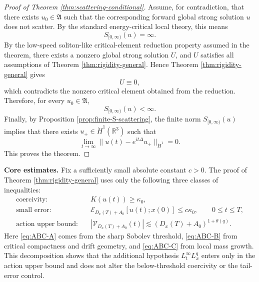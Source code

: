 \documentclass[smallextended,envcountsect,nospthms]{svjour3}
\numberwithin{equation}{section}
\theoremstyle{spbreak}
\theoremstyle{spdefbreak}
\theoremstyle{spdefbreak}
\newcommand{\R}{\mathbb R}
\begin{document}
\begin{proof}[Proof of Theorem \ref{thm:scattering-conditional}]
Assume, for contradiction, that there exists $u_0\in\mathfrak A$ such that the corresponding forward global strong solution $u$ does not scatter. By the standard energy-critical local theory, this means
\begin{equation*}
  S_{[0,\infty)}(u)=\infty.
\end{equation*}
By the low-speed soliton-like critical-element reduction property assumed in the theorem, there exists a nonzero global strong solution $U$, and $U$ satisfies all assumptions of Theorem \ref{thm:rigidity-general}. Hence Theorem \ref{thm:rigidity-general} gives
\begin{equation*}
  U\equiv0,
\end{equation*}
which contradicts the nonzero critical element obtained from the reduction. Therefore, for every $u_0\in\mathfrak A$,
\begin{equation*}
  S_{[0,\infty)}(u)<\infty.
\end{equation*}
Finally, by Proposition \ref{prop:finite-S-scattering}, the finite norm $S_{[0,\infty)}(u)$ implies that there exists $u_+\in\dot H^1(\R^3)$ such that
\begin{equation*}
  \lim_{t\to\infty}\|u(t)-e^{it\Delta}u_+\|_{\dot H^1}=0.
\end{equation*}
This proves the theorem.
\end{proof}

\medskip
\noindent\textbf{Core estimates.} Fix a sufficiently small absolute constant $c>0$. The proof of Theorem \ref{thm:rigidity-general} uses only the following three classes of inequalities:
\begin{align}
  \text{coercivity:}\quad &K(u(t))\ge\kappa_0,
  \label{eq:ABC-A}\\
  \text{small error:}\quad &\mathcal E_{D_x(T)+A_0}[u(t);x(0)]\le c\kappa_0,
  \qquad 0\le t\le T,
  \label{eq:ABC-B}\\
  \text{action upper bound:}\quad &|\mathcal V_{D_x(T)+A_0}(t)|
  \lesssim (D_x(T)+A_0)^{1+\theta(q)}.
  \label{eq:ABC-C}
\end{align}
Here \eqref{eq:ABC-A} comes from the sharp Sobolev threshold, \eqref{eq:ABC-B} from critical compactness and drift geometry, and \eqref{eq:ABC-C} from local mass growth. This decomposition shows that the additional hypothesis $L_t^\infty L_x^q$ enters only in the action upper bound and does not alter the below-threshold coercivity or the tail-error control.
\end{document}
